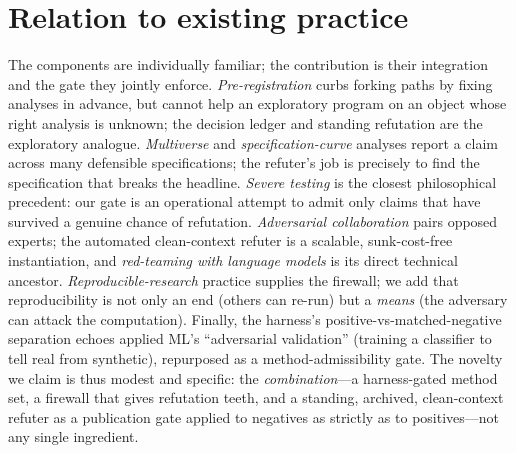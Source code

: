 \documentclass[11pt]{article}
\begin{document}
\section{Relation to existing practice}
The components are individually familiar; the contribution is their integration and the gate
they jointly enforce. \emph{Pre-registration} \citep{nosek2018preregistration} curbs forking
paths by fixing analyses in advance, but cannot help an exploratory program on an object whose
right analysis is unknown; the decision ledger and standing refutation are the exploratory
analogue. \emph{Multiverse} \citep{steegen2016multiverse} and \emph{specification-curve}
\citep{simonsohn2020specification} analyses report a claim across many defensible
specifications; the refuter's job is precisely to find the specification that breaks the
headline. \emph{Severe testing} \citep{mayo2018severe} is the closest philosophical
precedent: our gate is an operational attempt to admit only claims that have survived a
genuine chance of refutation. \emph{Adversarial collaboration} \citep{mellers2001adversarial}
pairs opposed experts; the automated clean-context refuter is a scalable, sunk-cost-free
instantiation, and \emph{red-teaming with language models} \citep{perez2022red} is its direct
technical ancestor. \emph{Reproducible-research} practice \citep{sandve2013ten} supplies the
firewall; we add that reproducibility is not only an end (others can re-run) but a
\emph{means} (the adversary can attack the computation). Finally, the harness's
positive-vs-matched-negative separation echoes applied ML's ``adversarial validation''
(training a classifier to tell real from synthetic), repurposed as a method-admissibility
gate. The novelty we claim is thus modest and specific: the \emph{combination}---a
harness-gated method set, a firewall that gives refutation teeth, and a standing, archived,
clean-context refuter as a publication gate applied to negatives as strictly as to
positives---not any single ingredient.
\end{document}
